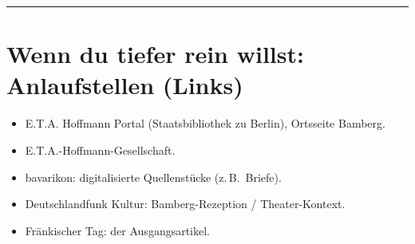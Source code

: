 \documentclass[11pt]{amsart}
\begin{document}
\bigskip
\hrule
\bigskip

\section{Wenn du tiefer rein willst: Anlaufstellen (Links)}
\begin{itemize}
  \item E.T.A. Hoffmann Portal (Staatsbibliothek zu Berlin), Ortsseite Bamberg.
  \item E.T.A.-Hoffmann-Gesellschaft.
  \item bavarikon: digitalisierte Quellenst\"ucke (z.\,B.\ Briefe).
  \item Deutschlandfunk Kultur: Bamberg-Rezeption / Theater-Kontext.
  \item Fr\"ankischer Tag: der Ausgangsartikel.
\end{itemize}
\end{document}
